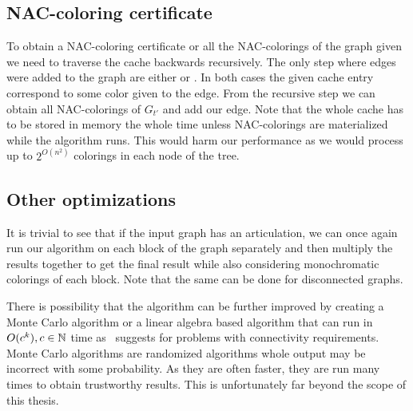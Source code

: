 \subsection{NAC-coloring certificate}

To obtain a NAC-coloring certificate or all the NAC-colorings of the graph
given we need to traverse the cache backwards recursively.
The only step where edges were added to the graph are either \IntroduceEdgeNode{}
or \IntroduceVertexWithEdgesNode{}. In both cases the given cache entry correspond
to some color given to the edge. From the recursive step we can obtain
all NAC-colorings of \( G_{t'} \) and add our edge.
Note that the whole cache has to be stored in memory the whole time unless
NAC-colorings are materialized while the algorithm runs.
This would harm our performance as we would
process up to \( 2^{O(n^2)} \) colorings in each node of the tree.


\subsection{Other optimizations}

It is trivial to see that if the input graph has an articulation,
we can once again run our algorithm on each block of the graph separately
and then multiply the results together to get the final result
while also considering monochromatic colorings of each block.
Note that the same can be done for disconnected graphs.

There is possibility that the algorithm can be further improved by creating
a Monte Carlo algorithm or a linear algebra based algorithm that can run
in \( O(c^k), c \in \mathbb{N} \) time as~\cite{book_parametrized_algorithms} suggests
for problems with connectivity requirements.
Monte Carlo algorithms are randomized algorithms whole output may be incorrect
with some probability. As they are often faster, they are run many times
to obtain trustworthy results.
This is unfortunately far beyond the scope of this thesis.


